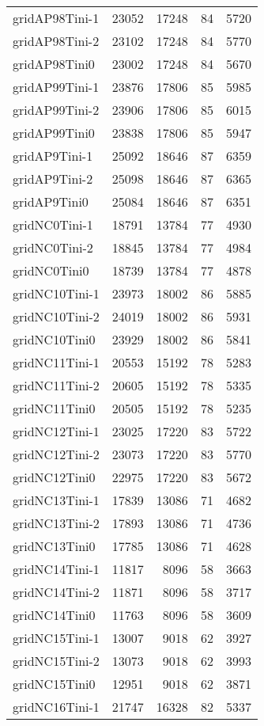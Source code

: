 \begin{longtable}{lrrrr}
gridAP98Tini-1 & 23052 & 17248 & 84 & 5720 \\
gridAP98Tini-2 & 23102 & 17248 & 84 & 5770 \\
gridAP98Tini0 & 23002 & 17248 & 84 & 5670 \\
gridAP99Tini-1 & 23876 & 17806 & 85 & 5985 \\
gridAP99Tini-2 & 23906 & 17806 & 85 & 6015 \\
gridAP99Tini0 & 23838 & 17806 & 85 & 5947 \\
gridAP9Tini-1 & 25092 & 18646 & 87 & 6359 \\
gridAP9Tini-2 & 25098 & 18646 & 87 & 6365 \\
gridAP9Tini0 & 25084 & 18646 & 87 & 6351 \\
gridNC0Tini-1 & 18791 & 13784 & 77 & 4930 \\
gridNC0Tini-2 & 18845 & 13784 & 77 & 4984 \\
gridNC0Tini0 & 18739 & 13784 & 77 & 4878 \\
gridNC10Tini-1 & 23973 & 18002 & 86 & 5885 \\
gridNC10Tini-2 & 24019 & 18002 & 86 & 5931 \\
gridNC10Tini0 & 23929 & 18002 & 86 & 5841 \\
gridNC11Tini-1 & 20553 & 15192 & 78 & 5283 \\
gridNC11Tini-2 & 20605 & 15192 & 78 & 5335 \\
gridNC11Tini0 & 20505 & 15192 & 78 & 5235 \\
gridNC12Tini-1 & 23025 & 17220 & 83 & 5722 \\
gridNC12Tini-2 & 23073 & 17220 & 83 & 5770 \\
gridNC12Tini0 & 22975 & 17220 & 83 & 5672 \\
gridNC13Tini-1 & 17839 & 13086 & 71 & 4682 \\
gridNC13Tini-2 & 17893 & 13086 & 71 & 4736 \\
gridNC13Tini0 & 17785 & 13086 & 71 & 4628 \\
gridNC14Tini-1 & 11817 & 8096 & 58 & 3663 \\
gridNC14Tini-2 & 11871 & 8096 & 58 & 3717 \\
gridNC14Tini0 & 11763 & 8096 & 58 & 3609 \\
gridNC15Tini-1 & 13007 & 9018 & 62 & 3927 \\
gridNC15Tini-2 & 13073 & 9018 & 62 & 3993 \\
gridNC15Tini0 & 12951 & 9018 & 62 & 3871 \\
gridNC16Tini-1 & 21747 & 16328 & 82 & 5337 \\

\end{longtable}

